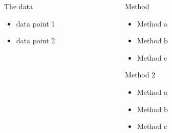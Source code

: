 \documentclass[final,hyperref={pdfpagelabels=false},xcolor=table]{beamer}
\newcommand{\shrink}{-15pt}
\begin{document}
\begin{frame}[t]
\begin{columns}[t]
\begin{column}{.3\textwidth}
       \begin{block}{The data}
      \begin{itemize}
      \item data point 1
      \item data point 2
      \end{itemize}
    \end{block}

  \end{column} %


  \begin{column}{.02\textwidth}\end{column} %

  \begin{column}{.3\textwidth} %
    \vspace{\shrink}
    \begin{block}{Method}

     \begin{itemize}
          \item Method a
          \item Method b
          \item Method c
     \end{itemize}
    \end{block}


   \begin{block}{Method 2}
     \begin{itemize}
          \item Method a
          \item Method b
          \item Method c
     \end{itemize}
    \end{block}

  \end{column} %


  \begin{column}{.02\textwidth}\end{column} %

  \begin{column}{.3\textwidth} %


\end{column}
\end{columns}
\end{frame}
\end{document}
